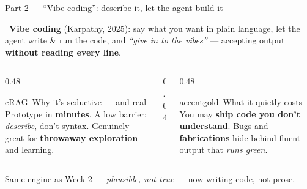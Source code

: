 \begin{frame}{Part 2 --- ``Vibe coding'': describe it, let the agent build it}
  \vspace{2pt}
  \begin{calloutbox}[accentgold]
    \small\faQuoteLeft\ \textbf{Vibe coding} (Karpathy, 2025): say what you want in
    plain language, let the agent write \& run the code, and \emph{``give in to the
    vibes''} --- accepting output \textbf{without reading every line}.
  \end{calloutbox}
  \vspace{8pt}
  \begin{columns}[t, totalwidth=\textwidth]
    \begin{column}{0.48\textwidth}
      \begin{featbox}{cRAG}{\faBolt\ Why it's seductive --- and real}
        \scriptsize Prototype in \textbf{minutes}. A low barrier: \emph{describe}, don't
        syntax. Genuinely great for \textbf{throwaway exploration} and learning.
      \end{featbox}
    \end{column}
    \begin{column}{0.04\textwidth}\end{column}
    \begin{column}{0.48\textwidth}
      \begin{featbox}{accentgold}{\faExclamationTriangle\ What it quietly costs}
        \scriptsize You may \textbf{ship code you don't understand}. Bugs and
        \textbf{fabrications} hide behind fluent output that \emph{runs green}.
      \end{featbox}
    \end{column}
  \end{columns}
  \vspace{6pt}
  \begin{center}\small\color{midgray}%
    Same engine as Week 2 --- \emph{plausible, not true} --- now writing code, not prose.\end{center}
\end{frame}

